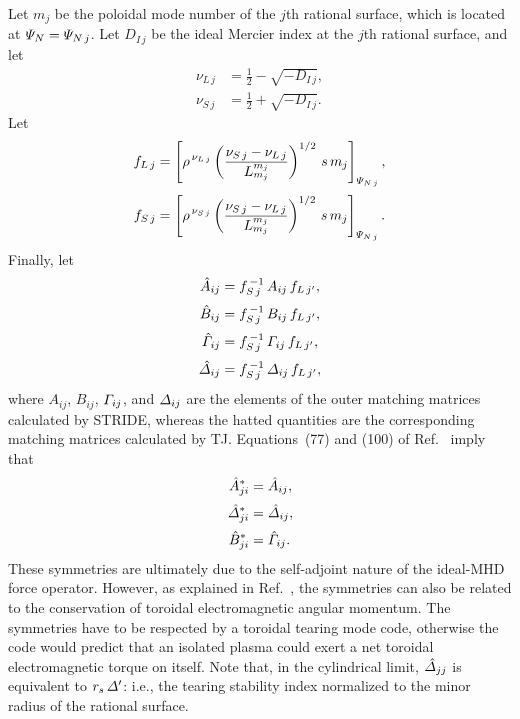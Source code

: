 \documentclass[12pt,prb,aps,notitlepage]{revtex4-1}
\begin{document}
Let $m_j$ be the poloidal mode number of the $j$th rational surface, which is located at ${\mit\Psi}_N= {\mit\Psi}_{N\,j}$. Let $D_{I\,j}$ be the ideal
Mercier index at the $j$th rational surface, and
let
\begin{align}
\nu_{L\,j} &=\frac{1}{2}-\sqrt{-D_{I\,j}},\\[0.5ex]
\nu_{S\,j} &=\frac{1}{2}+\sqrt{-D_{I\,j}}.
\end{align}
Let
\begin{align}
f_{L\,j} &= \left[\rho^{\,\nu_{L\,j}}
\left(\frac{\nu_{S\,j}-\nu_{L\,j}}{L_{m_j}^{m_j}}\right)^{1/2}\,s\,m_j
\right]_{{\mit\Psi}_{N\,j}},\\[0.5ex]
f_{S\,j} &= \left[\rho^{\,\nu_{S\,j}}
\left(\frac{\nu_{S\,j}-\nu_{L\,j}}{L_{m_j}^{m_j}}\right)^{1/2}\,s\,m_j
\right]_{{\mit\Psi}_{N\,j}}.
\end{align}
Finally, let
\begin{align}
\hat{A}_{ij}&= f_{S\,j}^{\,-1}\,A_{ij}\,f_{L\,j'},\\[0.5ex]
\hat{B}_{ij}&= f_{S\,j}^{\,-1}\,B_{ij}\,f_{L\,j'},\\[0.5ex]
\hat{\mit\Gamma}_{ij}&= f_{S\,j}^{\,-1}\,{\mit\Gamma}_{ij}\,f_{L\,j'},\\[0.5ex]
\hat{\mit\Delta}_{ij}&= f_{S\,j}^{\,-1}\,{\mit\Delta}_{ij}\,f_{L\,j'},
\end{align}
where $A_{ij}$, $B_{ij}$, ${\mit\Gamma}_{ij}$, and ${\mit\Delta}_{ij}$ are the elements of the outer matching matrices
calculated by STRIDE, whereas the hatted quantities are the  corresponding matching matrices calculated by TJ. 
Equations~(77) and (100) of Ref.~ imply that
\begin{align}
\hat{A}_{ji}^\ast &= \hat{A}_{ij},\\[0.5ex]
\hat{\mit\Delta}_{ji}^\ast &= \hat{\mit\Delta}_{ij},\\[0.5ex]
\hat{B}_{ji}^\ast &= \hat{\mit\Gamma}_{ij}.
\end{align}
These symmetries are ultimately due to the self-adjoint nature of the ideal-MHD force operator. However, as explained
in Ref.~, the symmetries can also be related to the conservation of toroidal electromagnetic angular momentum. The
symmetries have to be respected by a toroidal tearing mode code, otherwise the code would predict that an isolated 
plasma could exert a net toroidal electromagnetic torque on itself. Note that, in the cylindrical limit, $\hat{\mit\Delta}_{jj}$ is equivalent to $r_s\,{\mit\Delta}'$: i.e.,
the tearing stability index normalized to the minor radius of the rational surface. 
\end{document}
